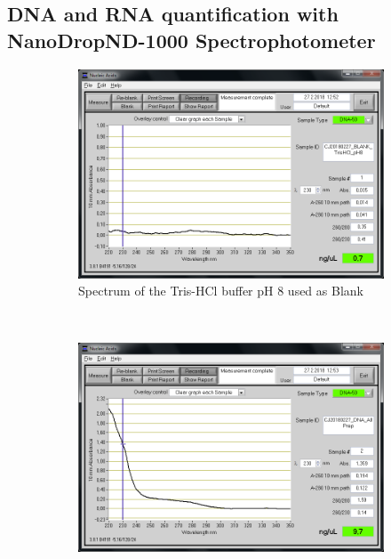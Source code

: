 \subsection{DNA and RNA quantification with NanoDrop\cR ND-1000 Spectrophotometer}
\label{task:20180227_cj1}

\begin{figure}[H] %
    \centering
    \caption{Title of the figure}
    \label{fig:label}
    \begin{subfigure}[b]{0.49\textwidth}
        \includegraphics[width=\textwidth]{graphics/screenshots/CJ20180227_BLANK_TrisHCl_pH8.png}
        \caption{Spectrum of the Tris-HCl buffer pH 8 used as Blank}
        \label{sfig:CJ20180227_BLANK_TrisHCl_pH8}
    \end{subfigure}
    ~ 
    \begin{subfigure}[b]{0.49\textwidth}
        \includegraphics[width=\textwidth]{graphics/screenshots/CJ20180227_DNA_AllPrep.png}

\end{subfigure}
\end{figure}
